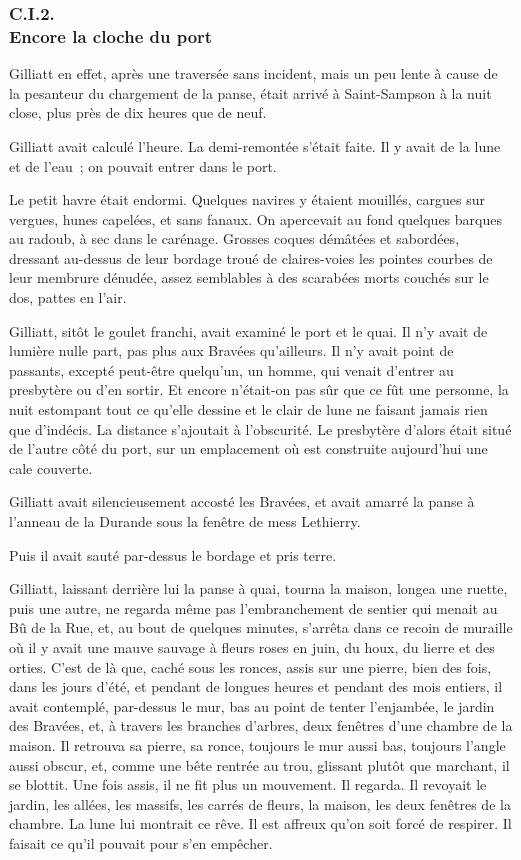 \documentclass[french,twoside]{book} %
\begin{document}
 \subsubsection[{C.I.2. Encore la cloche du port}]{C.I.2. \\
Encore la cloche du port}
\noindent Gilliatt en effet, après une traversée sans incident, mais un peu lente à cause de la pesanteur du chargement de la panse, était arrivé à Saint-Sampson à la nuit close, plus près de dix heures que de neuf.\par
Gilliatt avait calculé l’heure. La demi-remontée s’était faite. Il y avait de la lune et de l’eau ; on pouvait entrer dans le port.\par
Le petit havre était endormi. Quelques navires y étaient mouillés, cargues sur vergues, hunes capelées, et sans fanaux. On apercevait au fond quelques barques au radoub, à sec dans le carénage. Grosses coques démâtées et sabordées, dressant au-dessus de leur bordage troué de claires-voies les pointes courbes de leur membrure dénudée, assez semblables à des scarabées morts couchés sur le dos, pattes en l’air.\par
Gilliatt, sitôt le goulet franchi, avait examiné le port et le quai. Il n’y avait de lumière nulle part, pas plus aux Bravées qu’ailleurs. Il n’y avait point de  passants, excepté peut-être quelqu’un, un homme, qui venait d’entrer au presbytère ou d’en sortir. Et encore n’était-on pas sûr que ce fût une personne, la nuit estompant tout ce qu’elle dessine et le clair de lune ne faisant jamais rien que d’indécis. La distance s’ajoutait à l’obscurité. Le presbytère d’alors était situé de l’autre côté du port, sur un emplacement où est construite aujourd’hui une cale couverte.\par
Gilliatt avait silencieusement accosté les Bravées, et avait amarré la panse à l’anneau de la Durande sous la fenêtre de mess Lethierry.\par
Puis il avait sauté par-dessus le bordage et pris terre.\par
Gilliatt, laissant derrière lui la panse à quai, tourna la maison, longea une ruette, puis une autre, ne regarda même pas l’embranchement de sentier qui menait au Bû de la Rue, et, au bout de quelques minutes, s’arrêta dans ce recoin de muraille où il y avait une mauve sauvage à fleurs roses en juin, du houx, du lierre et des orties. C’est de là que, caché sous les ronces, assis sur une pierre, bien des fois, dans les jours d’été, et pendant de longues heures et pendant des mois entiers, il avait contemplé, par-dessus le mur, bas au point de tenter l’enjambée, le jardin des Bravées, et, à travers les branches d’arbres, deux fenêtres d’une chambre de la maison. Il retrouva sa pierre, sa ronce, toujours le mur aussi bas, toujours l’angle aussi obscur, et, comme une bête rentrée au trou, glissant plutôt que marchant, il se blottit. Une fois assis, il ne fit plus un mouvement. Il regarda. Il revoyait le jardin,  les allées, les massifs, les carrés de fleurs, la maison, les deux fenêtres de la chambre. La lune lui montrait ce rêve. Il est affreux qu’on soit forcé de respirer. Il faisait ce qu’il pouvait pour s’en empêcher.\par
\end{document}
